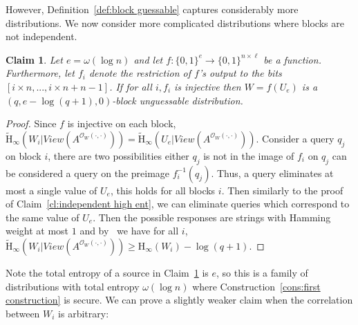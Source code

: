 \documentclass[11pt]{article}
\newcommand{\defref}[1]{\mbox{Definition~\ref{#1}}}
\newcommand{\clref}[1]{\mbox{Claim~\ref{#1}}}
\newcommand{\consref}[1]{\mbox{Construction~\ref{#1}}}
\newcommand{\zo}{\ensuremath{\{0, 1\}}}
\newcommand{\Hoo}{\mathrm{H}_\infty}
\newcommand{\Hav}{\tilde{\mathrm{H}}_\infty}
\newtheorem{claim}[theorem]{Claim}
\begin{document}
However, \defref{def:block guessable} captures considerably more distributions.  We now consider more complicated distributions where blocks are not independent.

\begin{claim}
\label{cl:each block from single seed}
Let $e =\omega(\log n)$ and let $f:\zo^e \rightarrow \zo^{n\times \ell}$ be a function.  Furthermore, let $f_i$ denote the restriction of $f$'s output to the bits $[i\times n,..., i\times n+n-1]$.  If for all $i, f_i$ is injective then $W = f(U_e)$ is a $( q, e - \log (q+1), 0)$-block unguessable distribution.
\end{claim}
\begin{proof}
Since $f$ is injective on each block, $\Hav(W_i | View(A^{\mathcal{O}_{W}(\cdot, \cdot)})) = \Hav(U_e | View(A^{\mathcal{O}_{W}(\cdot, \cdot)}))$.  Consider a query $q_j$ on block $i$, there are two possibilities either $q_j$ is not in the image of $f_i$ on $q_j$ can be considered a query on the preimage $f_i^{-1}(q_j)$.  Thus, a query eliminates at most a single value of $U_e$, this holds for all blocks $i$.  Then similarly to the proof of \clref{cl:independent high ent}, we can eliminate queries which correspond to the same value of $U_e$.  Then the possible responses are strings with Hamming weight at most $1$ and by~\cite[Lemma 2.2]{DBLP:journals/siamcomp/DodisORS08} we have for all $i$, $\Hav(W_i | View(A^{\mathcal{O}_{W}(\cdot, \cdot)})) \geq \Hoo(W_i) -\log (q+1)$.
\end{proof}

Note the total entropy of a source in \clref{cl:each block from single seed} is $e$, so this is a family of distributions with total entropy $\omega(\log n)$ where \consref{cons:first construction} is secure.  We can prove a slightly weaker claim when the correlation between $W_i$ is arbitrary:
\end{document}
